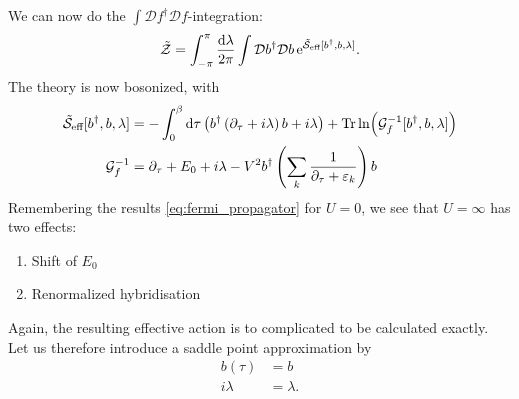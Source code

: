 We can now do the $\int\mathcal{D}f^\dagger\mathcal{D}f$-integration:
\begin{equation}
	\tilde{\mathcal{Z}} = \int_{-\pi}^\pi\frac{\dd{\lambda}}{2\pi}\int\mathcal{D}b^\dagger\mathcal{D}b\,\mathrm{e}^{\tilde{\mathcal{S}}_{\text{eff}}[b^\dagger, b, \lambda]}.
\end{equation}
The theory is now bosonized, with
\begin{align}
\tilde{\mathcal{S}}_{\text{eff}}[b^\dagger, b, \lambda] &= -\int_0^\beta \dd{\tau}\left(b^\dagger\left(\partial_\tau + i\lambda\right)b + i\lambda\right) + \Tr\ln(\mathcal{G}_f^{-1}[b^\dagger, b, \lambda]) \\
\mathcal{G}_f^{-1} &= \partial_\tau + E_0 + i\lambda-V^2b^\dagger\left(\sum_k\frac{1}{\partial_\tau + \varepsilon_k}\right)b
\end{align}
Remembering the results \eqref{eq:fermi_propagator} for $U=0$, we see that $U=\infty$ has two effects:
\begin{enumerate}[i]
	\item Shift of $E_0$
	\item Renormalized hybridisation
\end{enumerate} 
Again, the resulting effective action is to complicated to be calculated exactly. Let us therefore introduce a saddle point approximation by
\begin{align*}
b(\tau)&= b\\
i\lambda &=\lambda.
\end{align*}

